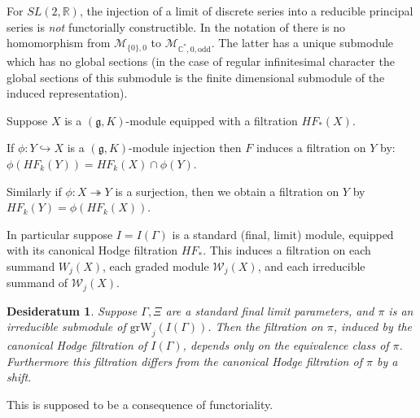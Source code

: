 \documentclass[12pt,leqno]{article}
\newtheorem{desideratum}[equation]{Desideratum}
\newcommand{\hf}{HF}
\newcommand{\w}{\text{grW}}
\newcommand{\caW}{\mathcal W}
\newcommand{\R}{\mathbb R}
\newcommand{\C}{\mathbb C}
\newcommand{\g}{\mathfrak g}
\begin{document}
\begin{exampleplain}
  For $SL(2,\R)$, the injection of a limit of discrete series into a
  reducible principal series is {\it not} functorially constructible.
  In the notation of \cite{schimd_vilonen_hodge_theory_sl2} there is
  no homomorphism from $\mathcal M_{\{0\},0}$ to
  $\mathcal M_{\C^*,0,\text{odd}}$. The latter has a unique submodule
  which has no global sections (in the case of regular infinitesimal
  character the global sections of this submodule is the finite
  dimensional submodule of the induced representation).
\end{exampleplain}

Suppose $X$ is a $(\g,K)$-module equipped with a filtration $\hf_*(X)$.

If $\phi\colon Y\hookrightarrow X$ is a $(\g,K)$-module injection then $F$
induces a filtration on $Y$ by: $\phi(\hf_k(Y))=\hf_k(X)\cap \phi(Y)$.

Similarly if $\phi\colon X\twoheadrightarrow Y$ is a surjection, then we
obtain a filtration on $Y$ by $\hf_k(Y)=\phi(\hf_k(X))$.

In particular suppose $I=I(\Gamma)$ is a standard (final, limit)
module, equipped with its canonical Hodge filtration $\hf_*$. This induces
a filtration on each summand $W_j(X)$, each graded module $\caW_j(X)$,
and each irreducible summand of $\caW_j(X)$.

\begin{desideratum}
\label{de:independent}
Suppose $\Gamma,\Xi$ are a standard final limit parameters, and $\pi$ is an irreducible  submodule of $\w_j(I(\Gamma))$.
Then the filtration on $\pi$, induced by the canonical Hodge filtration of $I(\Gamma)$, depends only on the equivalence class of $\pi$.
Furthermore this filtration differs from the canonical Hodge filtration of $\pi$ by a shift.
\end{desideratum}

This is supposed to be a consequence of functoriality.



\end{document}
